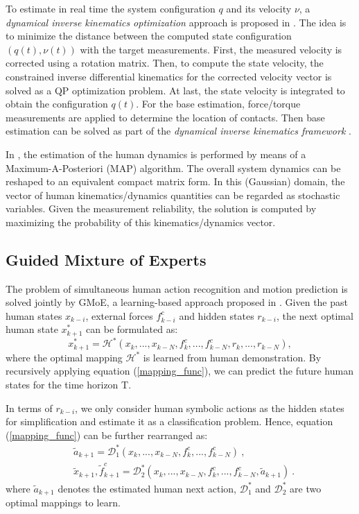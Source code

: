 To estimate in real time the system configuration $q$ and its velocity $\nu$, a \emph{dynamical inverse kinematics optimization} approach is proposed in \cite{Rapetti2020}. The idea is to minimize the distance between the computed state configuration $(q(t), \nu(t))$ with the target measurements. First, the measured velocity is corrected using a rotation matrix. Then, to compute the state velocity, the constrained inverse differential kinematics for the corrected velocity vector is solved as a QP optimization problem. At last, the state velocity is integrated to obtain the configuration $q(t)$. For the base estimation, force/torque measurements are applied to determine the location of contacts. Then base estimation can be solved as part of the \emph{dynamical inverse kinematics framework} \cite{Ramadoss2022}.

In \cite{Latella2019}, the estimation of the human dynamics is performed by means of a Maximum-A-Posteriori (MAP) algorithm. The overall system dynamics can be reshaped to an equivalent compact matrix form. In this (Gaussian) domain, the vector of human kinematics/dynamics quantities can be regarded as stochastic variables. Given the measurement reliability, the solution is computed by maximizing the probability of this kinematics/dynamics vector.  

\subsection{Guided Mixture of Experts}
The problem of simultaneous human action recognition and motion prediction is solved jointly by GMoE,  a learning-based approach proposed in \cite{Kourosh2022}. Given the past human states $x_{k-i}$, external forces $f_{k-i}^c$ and hidden states $r_{k-i}$, the next optimal human state $x_{k+1}^{*}$ can be formulated as:
\begin{equation}\label{mapping_func}
    x_{k+1}^{*} = \mathcal{H}^{*}(x_k,..., x_{k-N}, f_k^c,..., f_{k-N}^c, r_k,..., r_{k-N}),
\end{equation}
where the optimal mapping $\mathcal{H}^{*}$ is learned from human demonstration. By recursively applying equation (\ref{mapping_func}), we can predict the future human states for the time horizon T.

In terms of $r_{k-i}$, we only consider human symbolic actions as the hidden states for simplification and estimate it as a classification problem. Hence, equation (\ref{mapping_func}) can be further rearranged as:
\begin{subequations}
\begin{align} \label{action_prediction}
&\tilde{a}_{k+1} = \mathcal{D}_1^*(x_k, ..., x_{k-N}, f_k^c, ..., f_{k-N}^c) ~,\\
\label{motion_prediction}
&\tilde{x}_{k+1}, \tilde{f}_{k+1}^c  = \mathcal{D}_2^*(x_k, ..., x_{k-N}, f_k^c, ..., f_{k-N}^c, \tilde{a}_{k+1}) ~.
\end{align}
\end{subequations}
where $\tilde{a}_{k+1}$ denotes the estimated human next action, $\mathcal{D}_1^*$ and $\mathcal{D}_2^*$ are two optimal mappings to learn.

